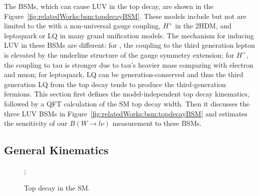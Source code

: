 The BSMs, which can cause LUV in the top decay, are shown in the Figure~\ref{fig:relatedWorks:bsm:topdecayBSM}. These models include but not are limited to the \PWpr with a non-universal gauge coupling, $H^+$ in the 2HDM, and leptoquark or LQ in many grand unification models. The mechanism for inducing LUV in these BSMs are different: for \PWpr, the coupling to the third generation lepton is elevated by the underline structure of the gauge symmetry extension; for $H^+$, the coupling to tau is stronger due to tau's heavier mass comparing with electron and muon; for leptoquark, LQ can be generation-conserved and thus the third generation LQ from the top decay tends to produce the third-generation fermions. This section first defines the model-independent top decay kinematics, followed by a QFT calculation of the SM top decay width. Then it discusses the three LUV BSMs in Figure~\ref{fig:relatedWorks:bsm:topdecayBSM} and estimates the sensitivity of our $B(W\to l \nu )$ measurement to these BSMs.



\subsection{General Kinematics}
\label{sec:relatedWorks:bsm:kinematics}

\begin{figure}[ht]
    \centering
    ;
    \caption{Top decay in the SM.}
    \label{fig:relatedWorks:bsm:topdecaySM}
\end{figure}

